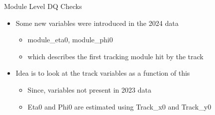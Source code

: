 \begin{frame}{Module Level DQ Checks}
    \begin{itemize}
        \item Some new variables were introduced in the 2024 data
        \begin{itemize}
            \item module\_eta0, module\_phi0
            \item which describes the first tracking module hit by the track
        \end{itemize}
        \item Idea is to look at the track variables as a function of this
        \begin{itemize}
            \item Since, variables not present in 2023 data
            \item Eta0 and Phi0 are estimated using Track\_x0 and Track\_y0
        \end{itemize}
        

    \end{itemize}
\end{frame}


